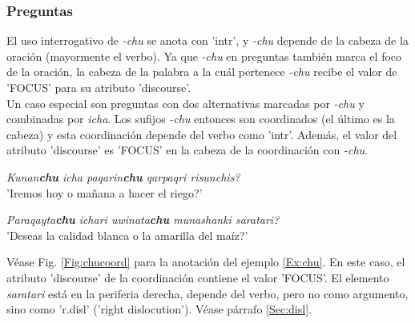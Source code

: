 \documentclass[a4paper,11pt,DIV12]{scrartcl}
\begin{document}
\subsubsection{Preguntas}

El uso interrogativo de {\em -chu} se anota con 'intr', y {\em -chu} depende de la cabeza de la oraci\'on (mayormente el verbo). Ya que {\em -chu} en preguntas tambi\'en marca el foco de la oraci\'on, la cabeza de la palabra a la cu\'al pertenece {\em -chu} recibe el valor de 'FOCUS' para su atributo 'discourse'.\\
Un caso especial son preguntas con dos alternativas marcadas por {\em -chu} y combinadas por {\em icha}. 
Los sufijos {\em -chu} entonces son coordinados (el \'ultimo es la cabeza) y esta coordinaci\'on depende del verbo como 'intr'. Adem\'as, el valor del atributo 'discourse' es 'FOCUS' en la cabeza de la coordinaci\'on con {\em -chu}.


\begin{examples}
 \item {\em Kunan\textbf{chu} icha paqarin\textbf{chu} qarpaqri risunchis?}\\
      '{\textquestiondown}Iremos hoy o ma\~nana a hacer el riego?'
 \item\label{Ex:chu} {\em Paraqayta\textbf{chu} ichari uwinata\textbf{chu} munashanki saratari?}\\
      '{\textquestiondown}Deseas la calidad blanca o la amarilla del ma\'iz?'\\
    		\hfill{\small \citep[236]{Cusi2}}
\end{examples}

V\'ease Fig. \ref{Fig:chucoord} para la anotaci\'on del ejemplo \ref{Ex:chu}. En este caso, el atributo 'discourse' de la coordinaci\'on contiene el valor 'FOCUS'. El elemento {\em saratari} est\'a en la periferia derecha, depende del verbo, pero no como argumento, sino como 'r.disl' ('right dislocution'). V\'ease p\'arrafo \ref{Sec:disl}.
\end{document}
